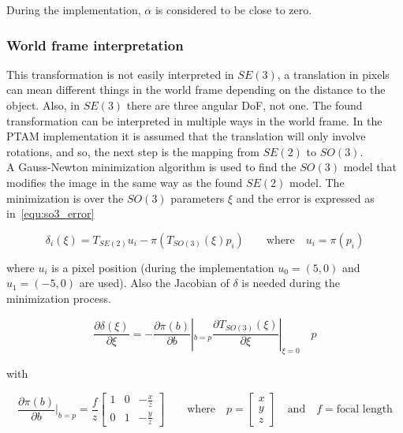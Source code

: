 During the implementation, $\alpha$ is considered to be close to zero.






\subsubsection{World frame interpretation}
\label{ssub:world_frame_interpretation}

This transformation is not easily interpreted in $SE(3)$, a translation in pixels can mean different things in the world frame depending on the distance to the object. Also, in $SE(3)$ there are three angular DoF, not one. The found transformation can be interpreted in multiple ways in the world frame. In the PTAM implementation it is assumed that the translation will only involve rotations, and so, the next step is the mapping from $SE(2)$ to $SO(3)$.\\

A Gauss-Newton minimization algorithm is used to find the $SO(3)$ model that modifies the image in the same way as the found $SE(2)$ model. The minimization is over the $SO(3)$ parameters $\xi$ and the error is expressed as in~\ref{equ:so3_error}

\begin{equation}
  \delta_i(\xi) = T_{SE(2)}u_i - \pi(T_{SO(3)}(\xi) p_i) \qquad \text{where} \quad u_i = \pi(p_i)
  \label{equ:so3_error}
\end{equation}


where $u_i$ is a pixel position (during the implementation $u_0=(5,0)$ and $u_1=(-5,0)$ are used). Also the Jacobian of $\delta$ is needed during the minimization process.

\begin{equation}
  \frac{\partial \delta(\xi)}{\partial \xi} = -\frac{\partial \pi (b)}{\partial b}|_{b=p} \frac{\partial T_{SO(3)}(\xi)}{\partial\xi}|_{\xi=0} \quad p
\end{equation}

with

\begin{equation}
  \frac{\partial \pi(b)}{\partial b} |_{b=p} = \frac{f}{z}
  \begin{bmatrix}
    1 & 0 & -\frac{x}{z} \\
    0 & 1 & -\frac{y}{z}
  \end{bmatrix}
  \qquad \text{where} \quad 
  p = \begin{bmatrix} x \\ y \\ z \end{bmatrix} \quad \text{and} \quad f = \text{focal length}
\end{equation}

